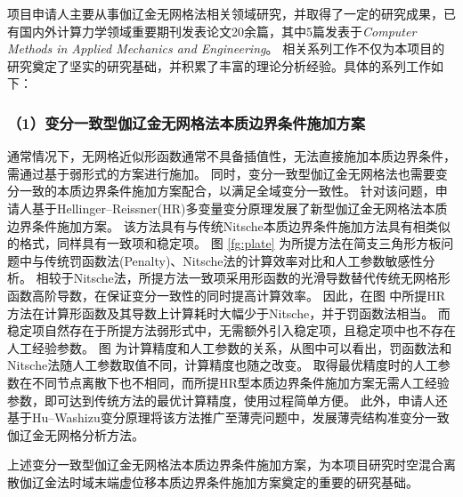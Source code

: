 

项目申请人主要从事伽辽金无网格法相关领域研究，并取得了一定的研究成果，已有国内外计算力学领域重要期刊发表论文20余篇，其中5篇发表于\textit{Computer Methods in Applied Mechanics and Engineering}。
相关系列工作不仅为本项目的研究奠定了坚实的研究基础，并积累了丰富的理论分析经验。具体的系列工作如下：

\subsubsection*{\bfseries （1）变分一致型伽辽金无网格法本质边界条件施加方案}
通常情况下，无网格近似形函数通常不具备插值性，无法直接施加本质边界条件，需通过基于弱形式的方案进行施加。
同时，变分一致型伽辽金无网格法也需要变分一致的本质边界条件施加方案配合，️以满足全域变分一致性。
针对该问题，申请人基于Hellinger--Reissner(HR)多变量变分原理发展了新型伽辽金无网格法本质边界条件施加方案。
该方法具有与传统Nitsche本质边界条件施加方法具有相类似的格式，同样具有一致项和稳定项。
图 \ref{fg:plate} 为所提方法在简支三角形方板问题中与传统罚函数法(Penalty)、Nitsche法的计算效率对比和人工参数敏感性分析。
相较于Nitsche法，所提方法一致项采用形函数的光滑导数替代传统无网格形函数高阶导数，在保证变分一致性的同时提高计算效率。
因此，在图  中所提HR方法在计算形函数及其导数上计算耗时大幅少于Nitsche，并于罚函数法相当。
而稳定项自然存在于所提方法弱形式中，无需额外引入稳定项，且稳定项中也不存在人工经验参数。
图  为计算精度和人工参数的关系，从图中可以看出，罚函数法和Nitsche法随人工参数取值不同，计算精度也随之改变。
取得最优精度时的人工参数在不同节点离散下也不相同，而所提HR型本质边界条件施加方案无需人工经验参数，即可达到传统方法的最优计算精度，使用过程简单方便。
此外，申请人还基于Hu--Washizu变分原理将该方法推广至薄壳问题中，发展薄壳结构准变分一致伽辽金无网格分析方法。

上述变分一致型伽辽金无网格法本质边界条件施加方案，为本项目研究时空混合离散伽辽金法时域末端虚位移本质边界条件施加方案奠定的重要的研究基础。

